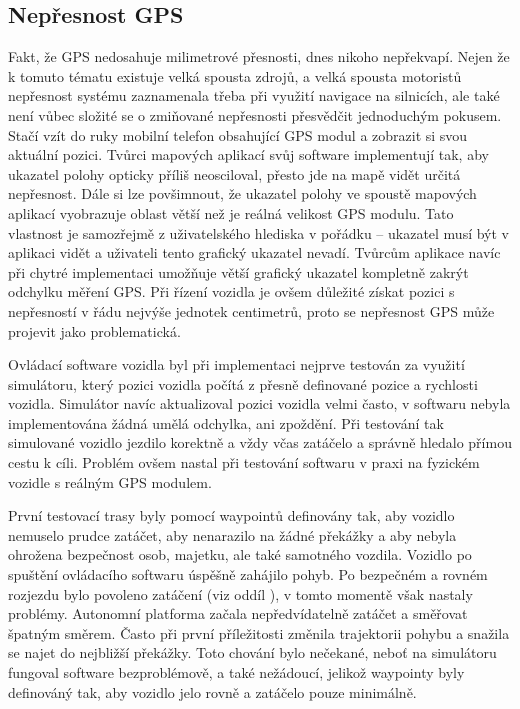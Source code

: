 \documentclass[czech, bachelor]{diploma}
\begin{document}
\subsection{Nepřesnost GPS} \label{gps-inaccuracy}

Fakt, že GPS nedosahuje milimetrové přesnosti, dnes nikoho nepřekvapí. Nejen že k tomuto tématu existuje velká spousta zdrojů,
a velká spousta motoristů nepřesnost systému zaznamenala třeba při využití navigace na silnicích, ale také není vůbec složité se 
o zmiňované nepřesnosti přesvědčit jednoduchým pokusem. Stačí vzít do ruky mobilní telefon obsahující GPS modul a zobrazit si svou
aktuální pozici. Tvůrci mapových aplikací svůj software implementují tak, aby ukazatel polohy opticky příliš neosciloval, přesto
jde na mapě vidět určitá nepřesnost. Dále si lze povšimnout, že ukazatel polohy ve spoustě mapových aplikací vyobrazuje oblast
větší než je reálná velikost GPS modulu. Tato vlastnost je samozřejmě z uživatelského hlediska v pořádku -- ukazatel musí být 
v aplikaci vidět a uživateli tento grafický ukazatel nevadí. Tvůrcům aplikace navíc při chytré implementaci umožňuje větší 
grafický ukazatel kompletně zakrýt odchylku měření GPS. Při řízení vozidla je ovšem důležité získat pozici s nepřesností v řádu
nejvýše jednotek centimetrů, proto se nepřesnost GPS může projevit jako problematická.

Ovládací software vozidla byl při implementaci nejprve testován za využití simulátoru, který pozici vozidla počítá z přesně 
definované pozice a rychlosti vozidla. Simulátor navíc aktualizoval pozici vozidla velmi často, v softwaru nebyla implementována
žádná umělá odchylka, ani zpoždění. Při testování tak simulované vozidlo jezdilo korektně a vždy včas zatáčelo a správně hledalo
přímou cestu k cíli. Problém ovšem nastal při testování softwaru v praxi na fyzickém vozidle s reálným GPS modulem.

První testovací trasy byly pomocí waypointů definovány tak, aby vozidlo nemuselo prudce zatáčet, aby nenarazilo na žádné překážky
a aby nebyla ohrožena bezpečnost osob, majetku, ale také samotného vozdila. Vozidlo po spuštění ovládacího softwaru úspěšně 
zahájilo pohyb. Po bezpečném a rovném rozjezdu bylo povoleno zatáčení (viz oddíl ), v tomto momentě
však nastaly problémy. Autonomní platforma začala nepředvídatelně zatáčet a směřovat špatným směrem. Často při první příležitosti
změnila trajektorii pohybu a snažila se najet do nejbližší překážky. Toto chování bylo nečekané, neboť na simulátoru fungoval
software bezproblémově, a také nežádoucí, jelikož waypointy byly definováný tak, aby vozidlo jelo rovně a zatáčelo pouze 
minimálně.
\end{document}
